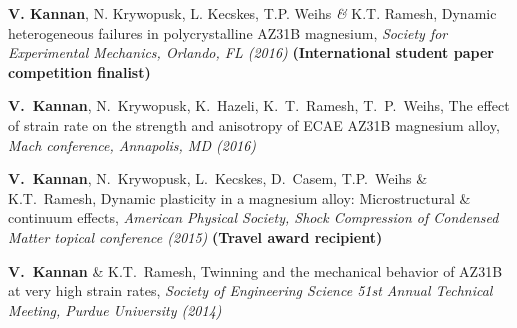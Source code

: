 \documentclass[a4paper,10pt, oneside]{article}
\begin{document}
\begin{enumerate}[label={[\arabic*]}, leftmargin=*]
		\item \textbf{V. Kannan}, N. Krywopusk, L. Kecskes, T.P. Weihs \emph{\&} K.T. Ramesh, Dynamic heterogeneous failures in polycrystalline AZ31B magnesium, \textit{Society for Experimental Mechanics, Orlando, FL (2016)} \textbf{{(International student paper competition finalist)}}
		\item \textbf{V.~Kannan}, N.~Krywopusk, K.~Hazeli, K.~T.~Ramesh, T.~P.~Weihs, The effect of strain rate on the strength and anisotropy of ECAE AZ31B magnesium alloy, \textit{Mach conference, Annapolis, MD (2016)}
		\item \textbf{V.~Kannan}, N.~Krywopusk, L.~Kecskes, D.~Casem, T.P.~Weihs \& K.T.~Ramesh, Dynamic plasticity in a magnesium alloy: Microstructural \& continuum effects, \textit{American Physical Society, Shock Compression of Condensed Matter topical conference (2015)}  \textbf{(Travel award recipient)}
		\item \textbf{V.~Kannan} \& K.T.~Ramesh, Twinning and the mechanical behavior of AZ31B at very high strain rates, \textit{Society of Engineering Science 51st Annual Technical Meeting, Purdue University (2014)}
	\end{enumerate}
\end{document}
